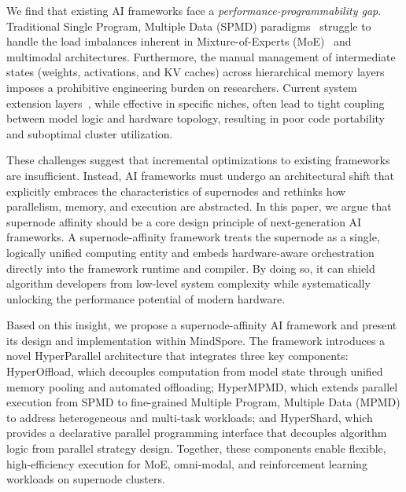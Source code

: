 \documentclass[11pt]{article}
\begin{document}
We find that existing AI frameworks face a \textit{performance-programmability gap}. Traditional Single Program, Multiple Data (SPMD) paradigms~\cite{darema2001spmd} struggle to handle the load imbalances inherent in Mixture-of-Experts (MoE)~\cite{chen2022towards,dettmers2023spqr} and multimodal architectures. Furthermore, the manual management of intermediate states (weights, activations, and KV caches) across hierarchical memory layers imposes a prohibitive engineering burden on researchers. Current system extension layers~\cite{barham2022pathways,jax2018github,jiang2024megascale,jung2025hlx,rasley2020deepspeed,ren2021zero,shoeybi2019megatron}, while effective in specific niches, often lead to tight coupling between model logic and hardware topology, resulting in poor code portability and suboptimal cluster utilization.



These challenges suggest that incremental optimizations to existing frameworks are insufficient. Instead, AI frameworks must undergo an architectural shift that explicitly embraces the characteristics of supernodes and rethinks how parallelism, memory, and execution are abstracted. In this paper, we argue that supernode affinity should be a core design principle of next-generation AI frameworks. A supernode-affinity framework treats the supernode as a single, logically unified computing entity and embeds hardware-aware orchestration directly into the framework runtime and compiler. By doing so, it can shield algorithm developers from low-level system complexity while systematically unlocking the performance potential of modern hardware.

Based on this insight, we propose a supernode-affinity AI framework and present its design and implementation within MindSpore. The framework introduces a novel HyperParallel architecture that integrates three key components: HyperOffload, which decouples computation from model state through unified memory pooling and automated offloading; HyperMPMD, which extends parallel execution from SPMD to fine-grained Multiple Program, Multiple Data (MPMD) to address heterogeneous and multi-task workloads; and HyperShard, which provides a declarative parallel programming interface that decouples algorithm logic from parallel strategy design. Together, these components enable flexible, high-efficiency execution for MoE, omni-modal, and reinforcement learning workloads on supernode clusters.
\end{document}
